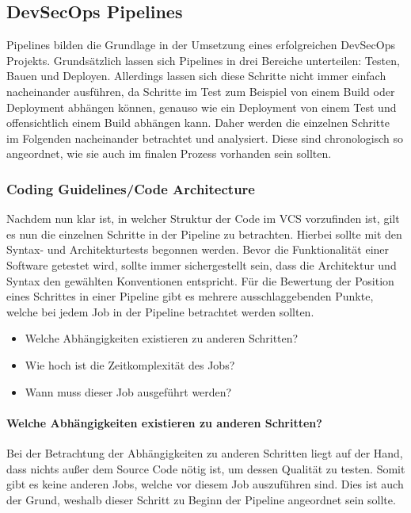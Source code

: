 \subsection{DevSecOps Pipelines}

Pipelines bilden die Grundlage in der Umsetzung eines erfolgreichen DevSecOps Projekts.
Grundsätzlich lassen sich Pipelines in drei Bereiche unterteilen: Testen, Bauen und Deployen.
Allerdings lassen sich diese Schritte nicht immer einfach nacheinander ausführen, da Schritte im Test zum Beispiel von einem Build oder Deployment abhängen können, genauso wie ein Deployment von einem Test und offensichtlich einem Build abhängen kann.
Daher werden die einzelnen Schritte im Folgenden nacheinander betrachtet und analysiert.
Diese sind chronologisch so angeordnet, wie sie auch im finalen Prozess vorhanden sein sollten.

\subsubsection{Coding Guidelines/Code Architecture}\label{subsec:codingGuidelines/codeArchitecture}

Nachdem nun klar ist, in welcher Struktur der Code im VCS vorzufinden ist, gilt es nun die einzelnen Schritte in der Pipeline zu betrachten.
Hierbei sollte mit den Syntax- und Architekturtests begonnen werden.
Bevor die Funktionalität einer Software getestet wird, sollte immer sichergestellt sein, dass die Architektur und Syntax den gewählten Konventionen entspricht.
Für die Bewertung der Position eines Schrittes in einer Pipeline gibt es mehrere ausschlaggebenden Punkte, welche bei jedem Job in der Pipeline betrachtet werden sollten.
\begin{itemize}
    \item Welche Abhängigkeiten existieren zu anderen Schritten?
    \item Wie hoch ist die Zeitkomplexität des Jobs?
    \item Wann muss dieser Job ausgeführt werden?
\end{itemize}

\paragraph{Welche Abhängigkeiten existieren zu anderen Schritten?}

Bei der Betrachtung der Abhängigkeiten zu anderen Schritten liegt auf der Hand, dass nichts außer dem Source Code nötig ist, um dessen Qualität zu testen.
Somit gibt es keine anderen Jobs, welche vor diesem Job auszuführen sind.
Dies ist auch der Grund, weshalb dieser Schritt zu Beginn der Pipeline angeordnet sein sollte.

